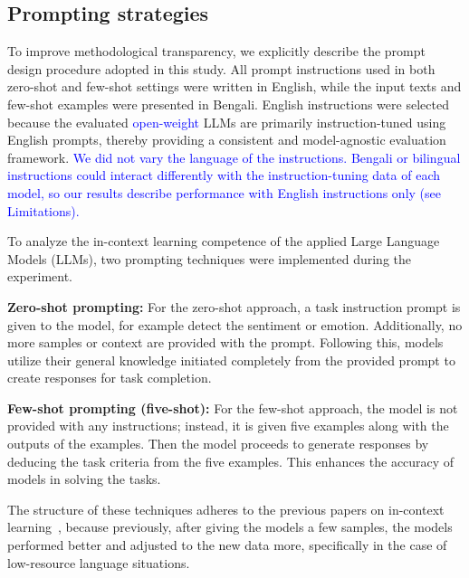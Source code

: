 \documentclass[10pt,letterpaper]{article}
\newcommand{\rev}[1]{\textcolor{blue}{#1}}
\begin{document}
\subsection*{Prompting strategies}
\label{sec:prompting}


To improve methodological transparency, we explicitly describe the prompt design procedure adopted in this study. All prompt instructions used in both zero-shot and few-shot settings were written in English, while the input texts and few-shot examples were presented in Bengali. English instructions were selected because the evaluated \rev{open-weight} LLMs are primarily instruction-tuned using English prompts, thereby providing a consistent and model-agnostic evaluation framework. \rev{We did not vary the language of the instructions. Bengali or bilingual instructions could interact differently with the instruction-tuning data of each model, so our results describe performance with English instructions only (see Limitations).}


To analyze the in-context learning competence of the applied Large Language Models (LLMs), two prompting techniques were implemented during the experiment.  

\textbf{Zero-shot prompting:} For the zero-shot approach, a task instruction prompt is given to the model, for example detect the sentiment or emotion. Additionally, no more samples or context are provided with the prompt. Following this, models utilize their general knowledge initiated completely from the provided prompt to create responses for task completion.  

\textbf{Few-shot prompting (five-shot):} For the few-shot approach, the model is not provided with any instructions; instead, it is given five examples along with the outputs of the examples. Then the model proceeds to generate responses by deducing the task criteria from the five examples. This enhances the accuracy of models in solving the tasks. 

The structure of these techniques adheres to the previous papers on in-context learning~\cite{b35,b43}, because previously, after giving the models a few samples, the models performed better and adjusted to the new data more, specifically in the case of low-resource language situations. 
\end{document}
